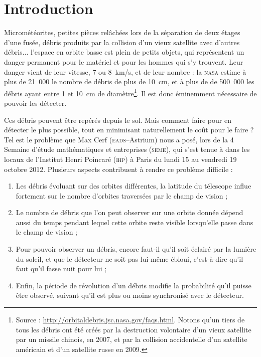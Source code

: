 

\section{Introduction}

Micrométéorites,
petites pièces relâchées lors de la séparation de deux étages d'une fusée, 
débris produits par la collision d'un vieux satellite avec d'autres débris... 
l'espace en orbite basse est plein de petits objets, qui représentent un danger permanent pour le matériel et pour les hommes qui s'y trouvent.
Leur danger vient de leur vitesse, 7 ou 8~km/s, et de leur nombre : la \textsc{nasa} estime à plus de 21~000 le nombre de débris de plus de 10~cm, et à plus de de 500~000 les débris ayant entre 1 et 10~cm de diamètre\footnote{Source : \url{http://orbitaldebris.jsc.nasa.gov/faqs.html}. Notons qu'un tiers de tous les débris ont été créés par la destruction volontaire d'un vieux satellite par un missile chinois, en 2007, et par la collision accidentelle d'un satellite américain et d'un satellite russe en 2009.}. Il est donc éminemment nécessaire de pouvoir les détecter.

Ces débris peuvent être repérés depuis le sol. Mais comment faire pour en détecter le plus possible, tout en minimisant naturellement le coût pour le faire ? Tel est le problème que Max Cerf (\textsc{eads}--Astrium) nous a posé, lors de la 4\ieme{} 
Semaine d'étude mathématiques et entreprises (\textsc{seme}), qui s'est tenue à
dans les locaux de l'Institut Henri Poincaré (\textsc{ihp}) à Paris du lundi 15
au vendredi 19 octobre 2012.  Plusieurs aspects contribuent à rendre ce problème difficile :
\begin{enumerate}
\item Les débris évoluant sur des orbites différentes, la latitude du télescope influe fortement sur le nombre d'orbites traversées par le champ de vision ;
\item Le nombre de débris que l'on peut observer sur une orbite donnée dépend aussi du temps pendant lequel cette orbite reste visible lorsqu'elle passe dans le champ de vision ;
\item Pour pouvoir observer un débris, encore faut-il qu'il soit éclairé par la lumière du soleil, et que le détecteur ne soit pas lui-même ébloui, c'est-à-dire qu'il faut qu'il fasse nuit pour lui ;
\item Enfin, la période de révolution d'un débris modifie la probabilité qu'il puisse être observé, suivant qu'il est plus ou moins synchronisé avec le détecteur.
\end{enumerate}

